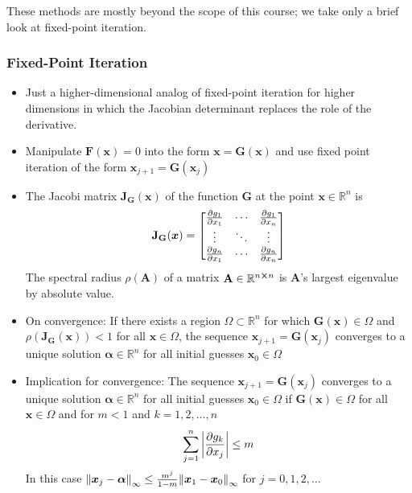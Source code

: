 \documentclass[11pt, a4paper]{article}
\newcommand{\R}{\mathbb{R}} %
\newcommand{\mat}[1]{\mathbf{#1}} %
\begin{document}
These methods are mostly beyond the scope of this course; we take only a brief look at fixed-point iteration.

\subsubsection{Fixed-Point Iteration}
\begin{itemize}
	\item Just a higher-dimensional analog of fixed-point iteration for higher dimensions in which the Jacobian determinant replaces the role of the derivative.
	
	\item Manipulate $ \bm{F}(\bm{x}) = 0 $ into the form $ \bm{x} = \bm{G}(\bm{x}) $ and use fixed point iteration of the form $ \bm{x}_{j+1} = \bm{G}(\bm{x}_{j}) $
	
	\item The Jacobi matrix $ \mat{J_{G}}(\bm{x}) $ of the function $ \bm{G} $ at the point $ \bm{x} \in \R^{n} $ is
	\[
		\mat{J_{G}}(\bm{x}) = 
		\begin{bmatrix}
			\pdv{g_{1}}{x_{1}} (\bm{x}) & \cdots & \pdv{g_{1}}{x_{n}} (\bm{x})\\
			\vdots & \ddots & \vdots\\
			\pdv{g_{n}}{x_{1}} (\bm{x}) & \cdots & \pdv{g_{n}}{x_{n}} (\bm{x})
		\end{bmatrix}
	\]
	The spectral radius $ \rho (\mat{A}) $ of a matrix $ \mat{A} \in \R^{n \cross n} $ is $ \mat{A} $'s largest eigenvalue by absolute value.
	
	\item On convergence: If there exists a region $ \Omega \subset \R^{n} $ for which $ \bm{G}(\bm{x}) \in \Omega $ and $ \rho(\mat{J_{G}}(\bm{x})) < 1$ for all $ \bm{x} \in \Omega $, the sequence $ \bm{x}_{j+1} = \bm{G}(\bm{x}_{j}) $ converges to a unique solution $ \bm{\alpha} \in \R^{n} $ for all initial guesses $ \bm{x}_{0} \in \Omega $
	
	\item Implication for convergence: The sequence $ \bm{x}_{j+1} = \bm{G}(\bm{x}_{j}) $ converges to a unique solution $ \bm{\alpha} \in \R^{n} $ for all initial guesses $ \bm{x}_{0} \in \Omega $ if  $ \bm{G}(\bm{x}) \in \Omega $ for all $ \bm{x} \in \Omega $ and for $ m < 1 $ and $ k = 1, 2, \dots, n$
	\begin{equation*}
		\sum_{j = 1}^{n} \abs{\pdv{g_{k}}{x_{j}} (\bm{x})} \leq m
	\end{equation*}
	In this case $ \norm{\bm{x}_{j} - \bm{\alpha}}_{\infty} \leq \frac{m^{j}}{1-m}\norm{\bm{x}_{1} - \bm{x}_{0}}_{\infty} $ for $ j = 0, 1, 2, \ldots $
\end{itemize}
\end{document}
